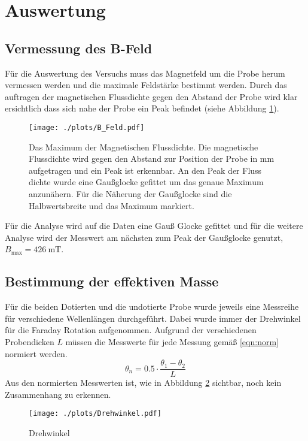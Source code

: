 \section{Auswertung}
\label{sec:Auswertung}
\subsection{Vermessung des B-Feld}
Für die Auswertung des Versuchs muss das Magnetfeld um die Probe herum vermessen werden und die maximale Feldstärke bestimmt werden.
Durch das auftragen der magnetischen Flussdichte gegen den Abstand der Probe wird klar ersichtlich dass sich nahe der Probe ein Peak befindet (siehe Abbildung \ref{fig:magnet}).
\begin{figure}[ht]
    \centering
    \texttt{[image: ./plots/B\_Feld.pdf]}
    \caption{Das Maximum der Magnetischen Flussdichte. Die magnetische Flussdichte wird gegen den Abstand zur Position der Probe in \si{\milli \metre} aufgetragen und ein Peak ist erkennbar. An den Peak der Fluss dichte wurde eine Gaußglocke gefittet um das genaue Maximum anzunähern. Für die Näherung der Gaußglocke sind die Halbwertsbreite und das Maximum markiert.}
    \label{fig:magnet}
\end{figure}
Für die Analyse wird auf die Daten eine Gauß Glocke gefittet und für die weitere Analyse wird der Messwert am nächsten zum Peak der Gaußglocke genutzt, $B_{\text{max}} = \SI{426}{\milli \tesla}$.

\subsection{Bestimmung der effektiven Masse}
Für die beiden Dotierten und die undotierte Probe wurde jeweils eine Messreihe für verschiedene Wellenlängen durchgeführt.
Dabei wurde immer der Drehwinkel für die Faraday Rotation aufgenommen.
Aufgrund der verschiedenen Probendicken $L$ müssen die Messwerte für jede Messung gemäß \ref{eqn:norm} normiert werden.
\begin{equation}
    \theta_{n} = 0.5 \cdot \frac{\theta_1 -\theta_2}{L}
    \label{eqn:norm}
\end{equation}
Aus den normierten Messwerten ist, wie in Abbildung \ref{fig:drehwinkel} sichtbar, noch kein Zusammenhang zu erkennen.
\begin{figure}[ht]
    \centering
    \texttt{[image: ./plots/Drehwinkel.pdf]}
    \caption{Drehwinkel}
    \label{fig:drehwinkel}
\end{figure}

